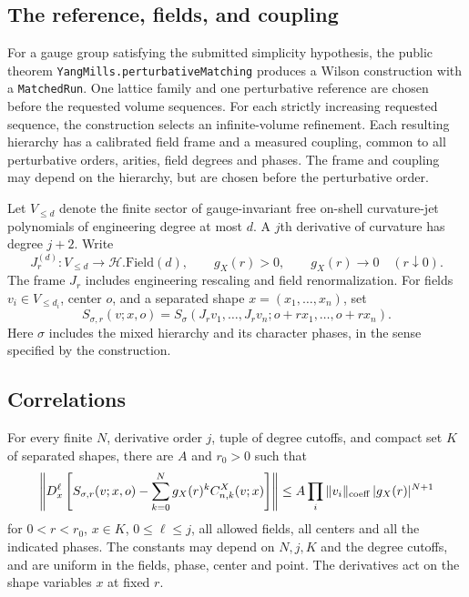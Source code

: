\documentclass[11pt]{article}
\newcommand{\code}[1]{{\small\nolinkurl{#1}}}
\begin{document}
\subsection{The reference, fields, and coupling}

For a gauge group satisfying the submitted simplicity hypothesis, the public
theorem \code{YangMills.perturbativeMatching} produces a Wilson construction
with a \code{MatchedRun}. One lattice family and one perturbative reference
are chosen before the requested volume sequences. For each strictly
increasing requested sequence, the construction selects an infinite-volume
refinement. Each resulting hierarchy has a calibrated field frame and a
measured coupling, common to all perturbative orders, arities, field degrees
and phases. The frame and coupling may depend on the hierarchy, but are
chosen before the perturbative order.

Let $V_{\le d}$ denote the finite sector of gauge-invariant free on-shell
curvature-jet polynomials of engineering degree at most $d$. A $j$th
derivative of curvature has degree $j+2$. Write
\[
 J_r^{(d)}:V_{\le d}\longrightarrow\mathcal H.\mathrm{Field}(d),
 \qquad g_X(r)>0,\qquad g_X(r)\longrightarrow0\quad(r\downarrow0).
\]
The frame $J_r$ includes engineering rescaling and field renormalization.
For fields $v_i\in V_{\le d_i}$, center $o$, and a separated shape
$x=(x_1,\ldots,x_n)$, set
\[
 S_{\sigma,r}(v;x,o)=
 S_\sigma(J_rv_1,\ldots,J_rv_n;o+rx_1,\ldots,o+rx_n).
\]
Here $\sigma$ includes the mixed hierarchy and its character phases, in the
sense specified by the construction.

\subsection{Correlations}

For every finite $N$, derivative order $j$, tuple of degree cutoffs, and
compact set $K$ of separated shapes, there are $A$ and $r_0>0$ such that
\begin{equation}\label{eq:matching}
 \left\|D_x^\ell\left[
 S_{\sigma,r}(v;x,o)-\sum_{k=0}^{N}g_X(r)^k C^X_{n,k}(v;x)
 \right]\right\|
 \le A\prod_i\|v_i\|_{\rm coeff}\,|g_X(r)|^{N+1}
\end{equation}
for $0<r<r_0$, $x\in K$, $0\le\ell\le j$, all allowed fields, all centers
and all the indicated phases. The constants may depend on $N,j,K$ and the
degree cutoffs, and are uniform in the fields, phase, center and point.
The derivatives act on the shape variables $x$ at fixed $r$.
\end{document}
